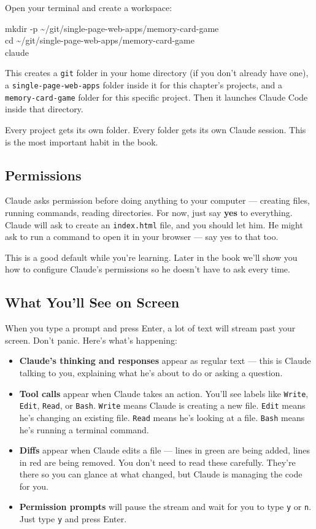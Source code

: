 \documentclass[11pt,a4paper]{article}
\begin{document}
Open your terminal and create a workspace:

\begin{tcolorbox}[termbox]
mkdir -p \textasciitilde/git/single-page-web-apps/memory-card-game\\
cd \textasciitilde/git/single-page-web-apps/memory-card-game\\
claude
\end{tcolorbox}

This creates a \texttt{git} folder in your home directory (if you don't already have one), a \texttt{single-page-web-apps} folder inside it for this chapter's projects, and a \texttt{memory-card-game} folder for this specific project. Then it launches Claude Code inside that directory.

Every project gets its own folder. Every folder gets its own Claude session. This is the most important habit in the book.

\subsection{Permissions}

Claude asks permission before doing anything to your computer --- creating files, running commands, reading directories. For now, just say \textbf{yes} to everything. Claude will ask to create an \texttt{index.html} file, and you should let him. He might ask to run a command to open it in your browser --- say yes to that too.

This is a good default while you're learning. Later in the book we'll show you how to configure Claude's permissions so he doesn't have to ask every time.

\subsection{What You'll See on Screen}

When you type a prompt and press Enter, a lot of text will stream past your screen. Don't panic. Here's what's happening:

\begin{itemize}[leftmargin=1.5em]
  \item \textbf{Claude's thinking and responses} appear as regular text --- this is Claude talking to you, explaining what he's about to do or asking a question.
  \item \textbf{Tool calls} appear when Claude takes an action. You'll see labels like \texttt{Write}, \texttt{Edit}, \texttt{Read}, or \texttt{Bash}. \texttt{Write} means Claude is creating a new file. \texttt{Edit} means he's changing an existing file. \texttt{Read} means he's looking at a file. \texttt{Bash} means he's running a terminal command.
  \item \textbf{Diffs} appear when Claude edits a file --- lines in green are being added, lines in red are being removed. You don't need to read these carefully. They're there so you can glance at what changed, but Claude is managing the code for you.
  \item \textbf{Permission prompts} will pause the stream and wait for you to type \texttt{y} or \texttt{n}. Just type \texttt{y} and press Enter.
\end{itemize}
\end{document}
